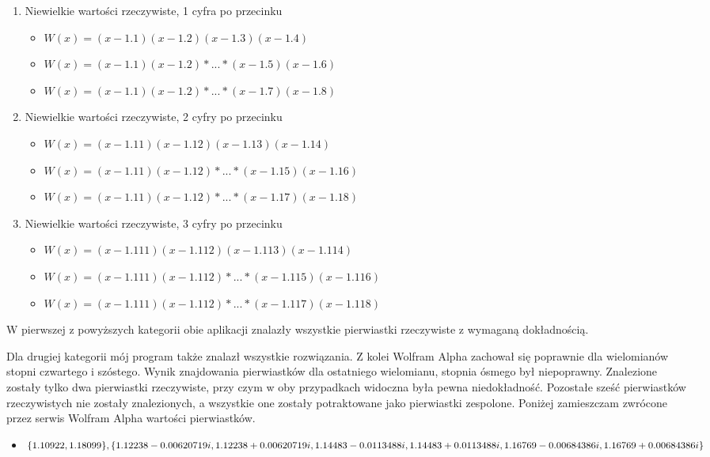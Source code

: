 \begin{enumerate}
	\item Niewielkie wartości rzeczywiste, 1 cyfra po przecinku
	\begin{itemize}
		\item $W(x)=(x-1.1)(x-1.2)(x-1.3)(x-1.4)$
		\item $W(x)=(x-1.1)(x-1.2)*...*(x-1.5)(x-1.6)$
		\item $W(x)=(x-1.1)(x-1.2)*...*(x-1.7)(x-1.8)$
	\end{itemize}
	\item Niewielkie wartości rzeczywiste, 2 cyfry po przecinku
	\begin{itemize}
		\item $W(x)=(x-1.11)(x-1.12)(x-1.13)(x-1.14)$
		\item $W(x)=(x-1.11)(x-1.12)*...*(x-1.15)(x-1.16)$
		\item $W(x)=(x-1.11)(x-1.12)*...*(x-1.17)(x-1.18)$
	\end{itemize}
	\item Niewielkie wartości rzeczywiste, 3 cyfry po przecinku
	\begin{itemize}
		\item $W(x)=(x-1.111)(x-1.112)(x-1.113)(x-1.114)$
		\item $W(x)=(x-1.111)(x-1.112)*...*(x-1.115)(x-1.116)$
		\item $W(x)=(x-1.111)(x-1.112)*...*(x-1.117)(x-1.118)$
	\end{itemize}
\end{enumerate}

W pierwszej z powyższych kategorii obie aplikacji znalazły wszystkie pierwiastki rzeczywiste z wymaganą dokładnością.

Dla drugiej kategorii mój program także znalazł wszystkie rozwiązania. Z kolei Wolfram Alpha zachował się poprawnie dla wielomianów stopni czwartego i szóstego. Wynik znajdowania pierwiastków dla ostatniego wielomianu, stopnia ósmego był niepoprawny. Znalezione zostały tylko dwa pierwiastki rzeczywiste, przy czym w oby przypadkach widoczna była pewna niedokładność. Pozostałe sześć pierwiastków rzeczywistych nie zostały znalezionych, a wszystkie one zostały potraktowane jako pierwiastki zespolone. Poniżej zamieszczam zwrócone przez serwis Wolfram Alpha wartości pierwiastków.

\begin{itemize}
	\item $\{1.10922, 1.18099\}, \{1.12238-0.00620719i, 1.12238+0.00620719i, \\
	1.14483-0.0113488i, 1.14483+0.0113488i, 1.16769-0.00684386 i, 1.16769+0.00684386i\}$
\end{itemize}

